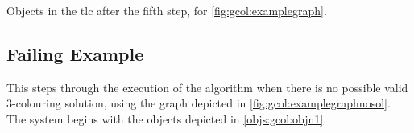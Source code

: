 \begin{cpobjectsfloat}
\begin{cpobjects}

    
    
    
            \cpobjectsline{\vdots}
            
    
\end{cpobjects}
\caption{\label{objs:gcol:obj6}Objects in the \gls{tlc} after the fifth step, for \cref{fig:gcol:examplegraph}.}
\end{cpobjectsfloat}


\subsection{\label{sec:gcol:examplefail}Failing Example}
This  steps through the execution of the algorithm when there is no possible valid 3-colouring solution, using the graph depicted in \cref{fig:gcol:examplegraphnosol}.  The system begins with the objects depicted in \cref{objs:gcol:objn1}.

